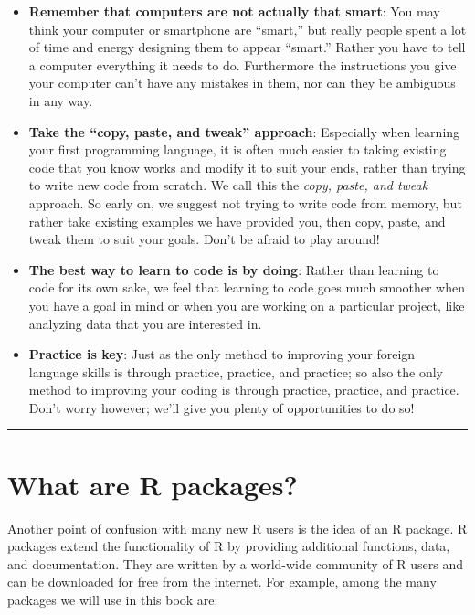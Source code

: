 \documentclass[12pt, krantz2,]{krantz}
\providecommand{\tightlist}{%
  \setlength{\itemsep}{0pt}\setlength{\parskip}{0pt}}
\begin{document}
\begin{itemize}
\tightlist
\item
  \textbf{Remember that computers are not actually that smart}: You may think your computer or smartphone are ``smart,'' but really people spent a lot of time and energy designing them to appear ``smart.'' Rather you have to tell a computer everything it needs to do. Furthermore the instructions you give your computer can't have any mistakes in them, nor can they be ambiguous in any way.
\item
  \textbf{Take the ``copy, paste, and tweak'' approach}: Especially when learning your first programming language, it is often much easier to taking existing code that you know works and modify it to suit your ends, rather than trying to write new code from scratch. We call this the \emph{copy, paste, and tweak} approach. So early on, we suggest not trying to write code from memory, but rather take existing examples we have provided you, then copy, paste, and tweak them to suit your goals. Don't be afraid to play around!
\item
  \textbf{The best way to learn to code is by doing}: Rather than learning to code for its own sake, we feel that learning to code goes much smoother when you have a goal in mind or when you are working on a particular project, like analyzing data that you are interested in.
\item
  \textbf{Practice is key}: Just as the only method to improving your foreign language skills is through practice, practice, and practice; so also the only method to improving your coding is through practice, practice, and practice. Don't worry however; we'll give you plenty of opportunities to do so!
\end{itemize}

\begin{center}\rule{0.5\linewidth}{\linethickness}\end{center}

\hypertarget{packages}{%
\section{What are R packages?}\label{packages}}

Another point of confusion with many new R users is the idea of an R package. R packages extend the functionality of R by providing additional functions, data, and documentation. They are written by a world-wide community of R users and can be downloaded for free from the internet. For example, among the many packages we will use in this book are:
\end{document}
